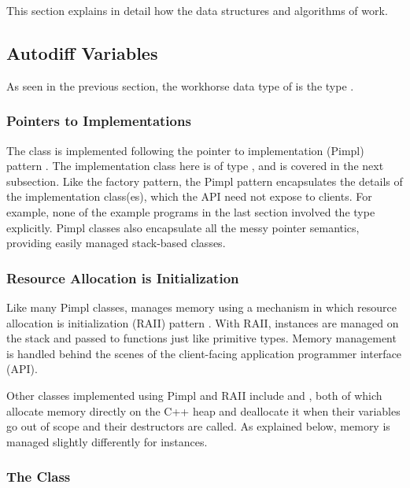 \documentclass[10pt]{article}
\begin{document}
This section explains in detail how the data structures and algorithms
of  work.


\subsection{Autodiff Variables}

As seen in the previous section, the workhorse data type of
 is the type .  

\subsubsection{Pointers to Implementations}

The  class is implemented following the pointer to
implementation (Pimpl) pattern \citep{sutter:98,sutter:01}.  The
implementation class here is of type , and is covered in
the next subsection.  Like the factory pattern, the Pimpl pattern
encapsulates the details of the implementation class(es), which the
API need not expose to clients.  For example, none of the example
programs in the last section involved the  type explicitly.
Pimpl classes also encapsulate all the messy pointer semantics,
providing easily managed stack-based classes.

\subsubsection{Resource Allocation is Initialization}

Like many Pimpl classes,  manages memory using a mechanism
in which resource allocation is initialization (RAII) pattern
\citep{stroustrup:94}.  With RAII, instances are managed on the stack
and passed to functions just like primitive types.  Memory management
is handled behind the scenes of the client-facing application
programmer interface (API).

Other classes implemented using Pimpl and RAII include
 and , both of which allocate
memory directly on the C++ heap and deallocate it when their variables
go out of scope and their destructors are called.  As explained below,
memory is managed slightly differently for 
instances.

\subsubsection{The  Class}
\end{document}

